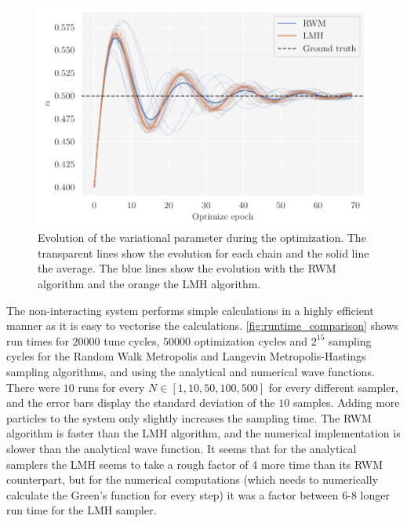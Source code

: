 \begin{figure}[!htb]
\begin{center}\includegraphics[width=\textwidth]{latex/figures/alpha_epoch_rwm_lmh.pdf}
\end{center}
\caption{Evolution of the variational parameter during the optimization. The transparent lines show the evolution for each chain and the solid line the average. The blue lines show the evolution with the RWM algorithm and the orange the LMH algorithm.}
\label{fig:alpha_epoch_both}
\end{figure}


The non-interacting system performs simple calculations in a highly efficient manner as it is easy to vectorise the calculations. \autoref{fig:runtime_comparison} shows run times for $20000$ tune cycles, $50000$ optimization cycles and $2^{15}$ sampling cycles for the Random Walk Metropolis and Langevin Metropolis-Hastings sampling algorithms, and using the analytical and numerical wave functions. There were $10$ runs for every $N\in[1, 10, 50, 100, 500]$ for every different sampler, and the error bars display the standard deviation of the $10$ samples. Adding more particles to the system only slightly increases the sampling time. The RWM algorithm is faster than the LMH algorithm, and the numerical implementation is slower than the analytical wave function. It seems that for the analytical samplers the LMH seems to take a rough factor of 4 more time than its RWM counterpart, but for the numerical computations (which needs to numerically calculate the Green's function for every step) it was a factor between 6-8 longer run time for the LMH sampler. 

